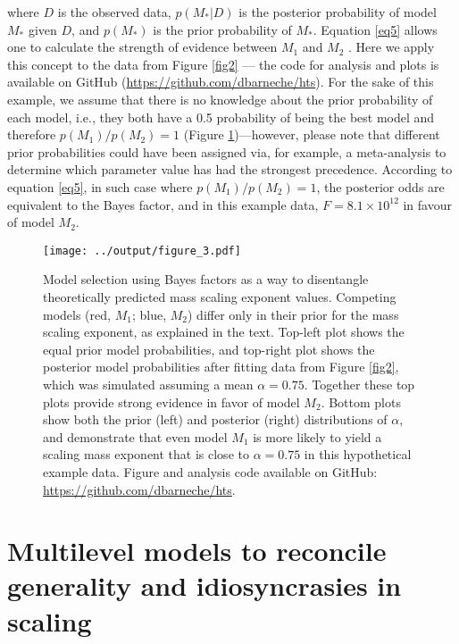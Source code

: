 \documentclass[a4paper,12pt]{article}
\begin{document}
where $D$ is the observed data, $p(M_\ast | D)$ is the posterior probability of model $M_\ast$ given $D$, and $p(M_\ast)$ is the prior probability of $M_\ast$. Equation \ref{eq5} allows one to calculate the strength of evidence between $M_1$ and $M_2$ \cite{benjamin2017nathumbeh, kruscke2018psybullrev, lakens2022tree}. Here we apply this concept to the data from Figure \ref{fig2} --- the code for analysis and plots is available on GitHub (\url{https://github.com/dbarneche/hts}). For the sake of this example, we assume that there is no knowledge about the prior probability of each model, i.e., they both have a 0.5 probability of being the best model and therefore $p(M_1)/p(M_2) = 1$ (Figure \ref{fig3})---however, please note that different prior probabilities could have been assigned via, for example, a meta-analysis to determine which parameter value has had the strongest precedence. According to equation \ref{eq5}, in such case where $p(M_1)/p(M_2) = 1$, the posterior odds are equivalent to the Bayes factor, and in this example data, $F = 8.1 \times 10^{12}$ in favour of model $M_2$.

\bigskip
\bigskip

\begin{figure}[h!]
  \begin{center}
    \texttt{[image: ../output/figure\_3.pdf]}
  \end{center}
  \caption{Model selection using Bayes factors as a way to disentangle theoretically predicted mass scaling exponent values. Competing models (red, $M_1$; blue, $M_2$) differ only in their prior for the mass scaling exponent, as explained in the text. Top-left plot shows the equal prior model probabilities, and top-right plot shows the posterior model probabilities after fitting data from Figure \ref{fig2}, which was simulated assuming a mean $\alpha = 0.75$. Together these top plots provide strong evidence in favor of model $M_2$. Bottom plots show both the prior (left) and posterior (right) distributions of $\alpha$, and demonstrate that even model $M_1$ is more likely to yield a scaling mass exponent that is close to $\alpha = 0.75$ in this hypothetical example data. Figure and analysis code available on GitHub: \url{https://github.com/dbarneche/hts}.}
  \label{fig3}
\end{figure}

\bigskip
\bigskip

\section{Multilevel models to reconcile generality and idiosyncrasies in scaling}
\end{document}

